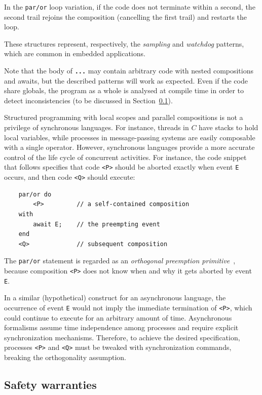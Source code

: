 \documentclass{sig-alternate}
\newcommand{\2}{\;\;}
\newcommand{\5}{\;\;\;\;\;}
\newcommand{\code}[1] {{\small{\texttt{#1}}}}
\begin{document}
In the \code{par/or} loop variation, if the code does not terminate within a 
second, the second trail rejoins the composition (cancelling the first trail) 
and restarts the loop.

These structures represent, respectively, the \emph{sampling} and 
\emph{watchdog} patterns, which are common in embedded applications.

Note that the body of \textbf{\code{...}} may contain arbitrary code with 
nested compositions and awaits, but the described patterns will work as 
expected.
Even if the code share globals, the program as a whole is analysed at compile 
time in order to detect inconsistencies (to be discussed in 
Section~\ref{sec:ceu:safety}).

Structured programming with local scopes and parallel compositions is not a 
privilege of synchronous languages.
For instance, threads in $C$ have stacks to hold local variables, while 
processes in message-passing systems are easily composable with a single 
operator.
However, synchronous languages provide a more accurate control of the life 
cycle of concurrent activities.
For instance, the code snippet that follows specifies that code \code{<P>} 
should be aborted exactly when event \code{E} occurs, and then code \code{<Q>} 
should execute:

\begin{verbatim}
    par/or do
        <P>         // a self-contained composition
    with
        await E;    // the preempting event
    end
    <Q>             // subsequent composition
\end{verbatim}

The \code{par/or} statement is regarded as an \emph{orthogonal preemption 
primitive}~\cite{esterel.preemption}, because composition \code{<P>} does not 
know when and why it gets aborted by event \code{E}.

In a similar (hypothetical) construct for an asynchronous language, the 
occurrence of event \code{E} would not imply the immediate termination of 
\code{<P>}, which could continue to execute for an arbitrary amount of time.
Asynchronous formalisms assume time independence among processes and require 
explicit synchronization mechanisms.
Therefore, to achieve the desired specification, processes \code{<P>} and 
\code{<Q>} must be tweaked with synchronization commands, breaking the
orthogonality assumption.~\cite{esterel.preemption}

\subsection{Safety warranties}
\label{sec:ceu:safety}
\end{document}
